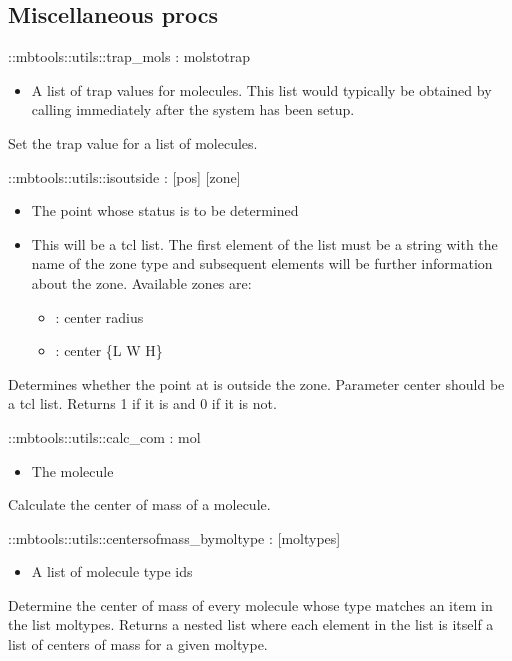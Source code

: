 \subsection{Miscellaneous procs}

\begin{code}    
  ::mbtools::utils::trap_mols  :  molstotrap
\end{code}
\begin{itemize}
\item {} A list of trap values for molecules. This list
  would typically be obtained by calling
   immediately after
  the system has been setup.
\end{itemize}
Set the trap value for a list of molecules.
\begin{code}    
  ::mbtools::utils::isoutside : [pos] [zone]
\end{code}
\begin{itemize}
\item {} The point whose status is to be determined
\item {} This will be a tcl list. The first element of the
  list must be a string with the name of the zone type and subsequent
  elements will be further information about the zone. Available zones
  are:
  \begin{itemize}
  \item {} : center radius
  \item {} : center \{L W H\}
  \end{itemize}
\end{itemize}
Determines whether the point at  is outside the
zone. Parameter center should be a tcl list. Returns 1 if it is and 0
if it is not.
\begin{code}
  ::mbtools::utils::calc_com : mol
\end{code}
\begin{itemize}
\item {} The molecule
\end{itemize}
Calculate the center of mass of a molecule.
\begin{code}    
  ::mbtools::utils::centersofmass_bymoltype : [moltypes]
\end{code}
\begin{itemize}
\item {} A list of molecule type ids
\end{itemize}
Determine the center of mass of every molecule whose type matches an
item in the list moltypes. Returns a nested list where each element in
the list is itself a list of centers of mass for a given moltype.

